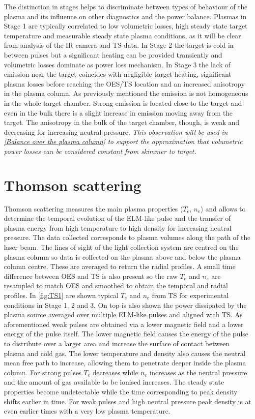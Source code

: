 The distinction in stages helps to discriminate between types of behaviour of the plasma and its influence on other diagnostics and the power balance. Plasmas in Stage 1 are typically correlated to low volumetric losses, high steady state target temperature and measurable steady state plasma conditions, as it will be clear from analysis of the IR camera and TS data. In Stage 2 the target is cold in between pulses but a significant heating can be provided transiently and volumetric losses dominate as power loss mechanism. In Stage 3 the lack of emission near the target coincides with negligible target heating, significant plasma losses before reaching the OES/TS location and an increased anisotropy in the plasma column.
As previously mentioned the emission is not homogeneous in the whole target chamber. Strong emission is located close to the target and even in the bulk there is a slight increase in emission moving away from the target. The anisotropy in the bulk of the target chamber, though, is weak and decreasing for increasing neutral pressure. \emph{This observation will be used in \autoref{Balance over the plasma column} to support the approximation that volumetric power losses can be considered constant from skimmer to target.}



\section{Thomson scattering}\label{Thomson scattering}


Thomson scattering measures the main plasma properties ($T_e$, $n_e$) and allows to determine the temporal evolution of the ELM-like pulse and the transfer of plasma energy from high temperature to high density for increasing neutral pressure. The data collected corresponds to plasma volumes along the path of the laser beam. The lines of sight of the light collection system are centred on the plasma column so data is collected on the plasma above and below the plasma column centre. These are averaged to return the radial profiles. A small time difference between OES and TS is also present so the raw $T_e$ and $n_e$ are resampled to match OES and smoothed to obtain the temporal and radial profiles.
In \autoref{fig:TS1} are shown typical $T_e$ and $n_e$ from TS for experimental conditions in Stage 1, 2 and 3. On top is also shown the power dissipated by the plasma source averaged over multiple ELM-like pulses and aligned with TS. As aforementioned weak pulses are obtained via a lower magnetic field and a lower energy of the pulse itself. The lower magnetic field causes the energy of the pulse to distribute over a larger area and increase the surface of contact between plasma and cold gas. The lower temperature and density also causes the neutral mean free path to increase, allowing them to penetrate deeper inside the plasma column. For strong pulses $T_e$ decreases while $n_e$ increases as the neutral pressure and the amount of gas available to be ionised increases. The steady state properties become undetectable while the time corresponding to peak density shifts earlier in time. For weak pulses and high neutral pressure peak density is at even earlier times with a very low plasma temperature.

